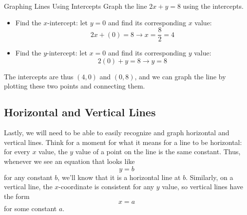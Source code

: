\begin{example}[https://www.youtube.com/watch?v=SkjLSvZBe0g]{Graphing Lines Using Intercepts}
Graph the line $2x+y=8$ using the intercepts.

\sol
\begin{itemize}
\item Find the $x$-intercept: let $y=0$ and find its corresponding $x$ value:
\[2x+(0)=8 \longrightarrow x=\dfrac{8}{2}=4\]
\item Find the $y$-intercept: let $x=0$ and find its corresponding $y$ value:
\[2(0)+y=8 \longrightarrow y=8\]
\end{itemize}

The intercepts are thus $(4,0)$ and $(0,8)$, and we can graph the line by plotting these two points and connecting them.
\begin{center}
\end{center}
\end{example}
\vfill
\pagebreak

\subsection{Horizontal and Vertical Lines}
Lastly, we will need to be able to easily recognize and graph horizontal and vertical lines.  Think for a moment for what it means for a line to be horizontal: for every $x$ value, the $y$ value of a point on the line is the same constant.  Thus, whenever we see an equation that looks like \[y=b\] for any constant $b$, we'll know that it is a horizontal line at $b$.  Similarly, on a vertical line, the $x$-coordinate is consistent for any $y$ value, so vertical lines have the form \[x=a\] for some constant $a$.

